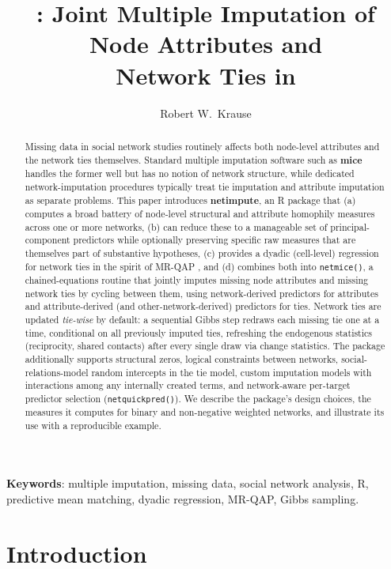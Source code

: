 \documentclass[11pt,a4paper]{article}
\title{\pkg{netimpute}: Joint Multiple Imputation of Node Attributes and\\
Network Ties in \proglang{R}}
\author{Robert W.\ Krause}
\date{}
\newcommand{\pkg}[1]{\textbf{#1}}
\newcommand{\code}[1]{\texttt{#1}}
\newcommand{\proglang}[1]{\textsf{#1}}
\begin{document}
\maketitle

\begin{abstract}
Missing data in social network studies routinely affects both node-level
attributes and the network ties themselves. Standard multiple imputation software such as
\pkg{mice} \citep{vanBuuren2011} handles the former well but has no notion of
network structure, while dedicated network-imputation procedures typically
treat tie imputation and attribute imputation as separate problems. This
paper introduces \pkg{netimpute}, an \proglang{R} package that (a) computes a
broad battery of node-level structural and attribute
homophily measures across one or more networks, (b) can reduce these to a
manageable set of principal-component predictors while optionally preserving
specific raw measures that are themselves part of substantive hypotheses,
(c) provides a dyadic (cell-level) regression for network ties in the
spirit of MR-QAP \citep{Krackhardt1988}, and (d) combines both into \code{netmice()}, a chained-equations
routine that jointly imputes missing node attributes and missing network ties
by cycling between them, using network-derived predictors for attributes and
attribute-derived (and other-network-derived) predictors for ties. Network
ties are updated \emph{tie-wise} by default: a sequential Gibbs step redraws
each missing tie one at a time, conditional on all previously imputed ties,
refreshing the endogenous statistics (reciprocity, shared contacts) after
every single draw via change statistics. The package additionally supports
structural zeros, logical constraints between networks, social-relations-model
random intercepts in the tie model, custom imputation models with
interactions among any internally created terms, and network-aware per-target
predictor selection (\code{netquickpred()}). We describe the package's design
choices, the measures it computes for binary and non-negative weighted
networks, and illustrate its use with a reproducible example.
\end{abstract}

\noindent
\textbf{Keywords}: multiple imputation, missing data, social network
analysis, \proglang{R}, predictive mean matching, dyadic regression,
MR-QAP, Gibbs sampling.

\section{Introduction}
\label{sec:intro}
\end{document}
